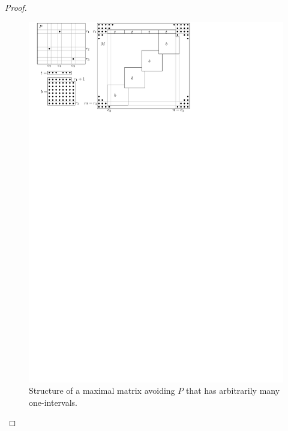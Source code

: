 \begin{proof}
\begin{figure}[!ht]
\centering
\includegraphics[width=120mm]{img/manyints.pdf}
\caption{Structure of a maximal matrix avoiding $P$ that has arbitrarily many one-intervals.}
\label{fig:manyints}
\end{figure}
\end{proof}

